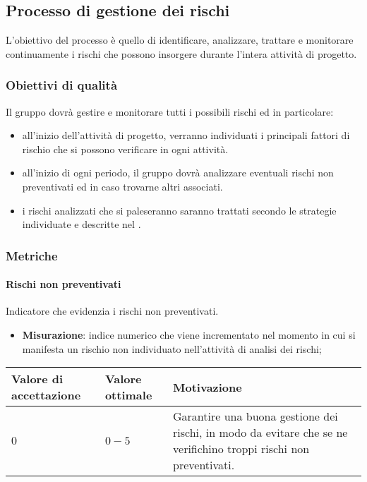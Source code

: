 \subsection{Processo di gestione dei rischi}
L'obiettivo del processo è quello di identificare, analizzare, trattare e monitorare continuamente i rischi che possono insorgere durante l'intera attività di progetto.

\subsubsection{Obiettivi di qualità}
Il gruppo dovrà gestire e monitorare tutti i possibili rischi ed in particolare:

\begin{itemize}
\item all'inizio dell'attività di progetto, verranno individuati i principali fattori di rischio che si possono verificare in ogni attività.
\item all'inizio di ogni periodo, il gruppo dovrà analizzare eventuali rischi non preventivati ed in caso trovarne altri associati.
\item i rischi analizzati che si paleseranno saranno trattati secondo le strategie individuate e descritte nel \PdP.
\end{itemize}

\subsubsection{Metriche}

\paragraph{Rischi non preventivati}
Indicatore che evidenzia i rischi non preventivati.
\begin{itemize}
\item \textbf{Misurazione}: indice numerico che viene incrementato nel momento in cui si manifesta un rischio non individuato nell'attività di analisi dei rischi;
\end{itemize}

\begin{center}
	\begin{tabular}{|P{2.5cm}|P{2.5cm}|P{6cm}|}
		\hline
			\textbf{Valore di accettazione}	& \textbf{Valore ottimale} & \textbf{Motivazione} \\
			\hline
			$0$ & $0 - 5$ & Garantire una buona gestione dei rischi, in modo da evitare che se ne verifichino troppi rischi non preventivati. \\
			\hline
			\end{tabular}
\end{center}



